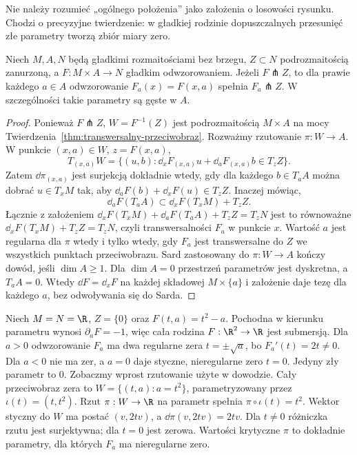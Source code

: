 Nie należy rozumieć „ogólnego położenia” jako
założenia o losowości rysunku. Chodzi o precyzyjne
twierdzenie: w gładkiej rodzinie dopuszczalnych
przesunięć złe parametry tworzą zbiór miary zero.

\begin{twierdzenie}
\label{thm:transwersalnosc-param}
Niech $M,A,N$ będą gładkimi rozmaitościami bez brzegu,
$Z\subset N$ podrozmaitością zanurzoną, a
$F:M\times A\to N$ gładkim odwzorowaniem.
Jeżeli $F\pitchfork Z$, to dla prawie każdego
$a\in A$ odwzorowanie $F_a(x)=F(x,a)$ spełnia
$F_a\pitchfork Z$. W szczególności takie
parametry są gęste w $A$.
\end{twierdzenie}
\begin{proof}
Ponieważ $F\pitchfork Z$,
$W=F^{-1}(Z)$ jest podrozmaitością
$M\times A$ na mocy
Twierdzenia~\ref{thm:transwersalny-przeciwobraz}.
Rozważmy rzutowanie $\pi:W\to A$.
W punkcie $(x,a)\in W$, $z=F(x,a)$,
\[
 T_{(x,a)}W
 =\{(u,b):\dd_xF_{(x,a)}u
              +\dd_aF_{(x,a)}b\in T_zZ\}.
\]
Zatem $\dd\pi_{(x,a)}$ jest surjekcją
dokładnie wtedy, gdy dla każdego $b\in T_aA$
można dobrać $u\in T_xM$ tak, aby
$\dd_aF(b)+\dd_xF(u)\in T_zZ$.
Inaczej mówiąc,
\[
 \dd_aF(T_aA)\subset
                 \dd_xF(T_xM)+T_zZ.
\]
Łącznie z założeniem
$\dd_xF(T_xM)+\dd_aF(T_aA)+T_zZ=T_zN$
jest to równoważne
$\dd_xF(T_xM)+T_zZ=T_zN$, czyli
transwersalności $F_a$ w punkcie $x$.
Wartość $a$ jest regularna dla $\pi$
wtedy i tylko wtedy, gdy $F_a$ jest
transwersalne do $Z$ we wszystkich punktach
przeciwobrazu. Sard zastosowany do
$\pi:W\to A$ kończy dowód, jeśli $\dim A\geq1$.
Dla $\dim A=0$ przestrzeń parametrów jest dyskretna,
a $T_aA=0$. Wtedy $\dd F=\dd_xF$ na każdej składowej
$M\times\{a\}$ i założenie daje tezę dla każdego $a$,
bez odwoływania się do Sarda.
\end{proof}

\begin{przyklad}
\label{prz:transwersalne-parabola}
Niech $M=N=\R$, $Z=\{0\}$ oraz
$F(t,a)=t^2-a$. Pochodna w kierunku parametru
wynosi $\partial_aF=-1$, więc cała rodzina
$F:\R^2\to\R$ jest submersją.
Dla $a>0$ odwzorowanie $F_a$ ma dwa regularne zera
$t=\pm\sqrt a$, bo $F_a'(t)=2t\ne0$.
Dla $a<0$ nie ma zer, a $a=0$ daje
styczne, nieregularne zero $t=0$.
Jedyny zły parametr to $0$.
Zobaczmy wprost rzutowanie użyte w dowodzie.
Cały przeciwobraz zera to
$W=\{(t,a):a=t^2\}$, parametryzowany przez $\iota(t)=(t,t^2)$.
Rzut $\pi:W\to\R$ na parametr spełnia
$\pi\circ\iota(t)=t^2$.
Wektor styczny do $W$ ma postać $(v,2tv)$,
a $\dd\pi(v,2tv)=2tv$.
Dla $t\ne0$ różniczka rzutu jest surjektywna;
dla $t=0$ jest zerowa. Wartości krytyczne $\pi$
to dokładnie parametry, dla których $F_a$ ma nieregularne zero.
\end{przyklad}


